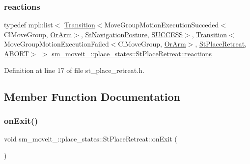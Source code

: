 \subsubsection{\texorpdfstring{reactions}{reactions}}
{\footnotesize\ttfamily typedef mpl\+::list$<$ \hyperlink{classsmacc_1_1Transition}{Transition}$<$Move\+Group\+Motion\+Execution\+Succeded$<$Cl\+Move\+Group, \hyperlink{classsm__moveit__4_1_1OrArm}{Or\+Arm}$>$, \hyperlink{structsm__moveit__4_1_1place__states_1_1StNavigationPosture}{St\+Navigation\+Posture}, \hyperlink{structsmacc_1_1default__transition__tags_1_1SUCCESS}{S\+U\+C\+C\+E\+SS}$>$, \hyperlink{classsmacc_1_1Transition}{Transition}$<$Move\+Group\+Motion\+Execution\+Failed$<$Cl\+Move\+Group, \hyperlink{classsm__moveit__4_1_1OrArm}{Or\+Arm}$>$, \hyperlink{structsm__moveit__4_1_1place__states_1_1StPlaceRetreat}{St\+Place\+Retreat}, \hyperlink{structsmacc_1_1default__transition__tags_1_1ABORT}{A\+B\+O\+RT}$>$ $>$ \hyperlink{structsm__moveit__4_1_1place__states_1_1StPlaceRetreat_a137af34354b6135e95217e02aefcc456}{sm\+\_\+moveit\+\_\+::place\+\_\+states\+::\+St\+Place\+Retreat\+::reactions}}



Definition at line 17 of file st\+\_\+place\+\_\+retreat.\+h.



\subsection{Member Function Documentation}
\mbox{\label{structsm__moveit__4_1_1place__states_1_1StPlaceRetreat_a700f6a70e4c9836fef4b4b3e9546500d}} 
\subsubsection{\texorpdfstring{on\+Exit()}{onExit()}}
{\footnotesize\ttfamily void sm\+\_\+moveit\+\_\+::place\+\_\+states\+::\+St\+Place\+Retreat\+::on\+Exit (\begin{DoxyParamCaption}{ }\end{DoxyParamCaption})\hspace{0.3cm}{\ttfamily [inline]}}



